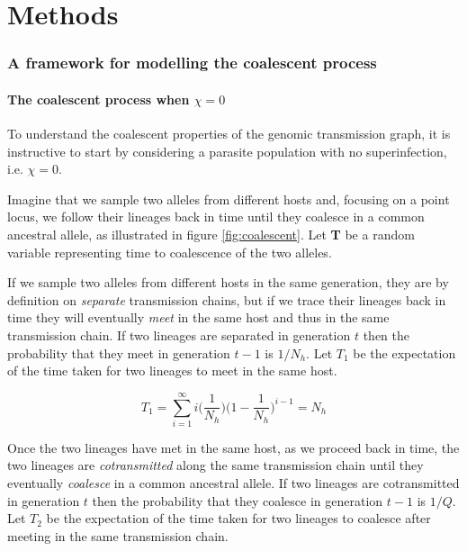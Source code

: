 \documentclass[_main.tex]{subfiles}
\begin{document}
\part*{Methods}
\label{supp_methods}

\section{A framework for modelling the coalescent process}

\subsection{The coalescent process when \texorpdfstring{$\chi = 0$}{chi is zero}}
\label{supp_coal_chi_zero}

To understand the coalescent properties of the genomic transmission graph, it is instructive to start by considering a parasite population with no superinfection, i.e. $\chi =0$.

Imagine that we sample two alleles from different hosts and, focusing on a point locus, we follow their lineages back in time until they coalesce in a common ancestral allele, as illustrated in figure \ref{fig:coalescent}.  Let \textbf{T} be a random variable representing time to coalescence of the two alleles.

If we sample two alleles from different hosts in the same generation, they are by definition on \textit{separate} transmission chains, but if we trace their lineages back in time they will eventually \textit{meet} in the same host and thus in the same transmission chain.  If two lineages are separated in generation $t$ then the probability that they meet in generation $t-1$ is $1/N_h$.   Let $T_1$ be the expectation of the time taken for two lineages to meet in the same host.

\begin{equation*}
T_1 = 
\sum_{i=1}^\infty
i \Big( \frac{1}{N_h} \Big)
\Big( 1 - \frac{1}{N_h} \Big)^{i-1}
 = N_h
\end{equation*}

Once the two lineages have met in the same host, as we proceed back in time, the two lineages are \textit{cotransmitted} along the same transmission chain until they eventually \textit{coalesce} in a common ancestral allele.  If two lineages are cotransmitted in generation $t$ then the probability that they coalesce in generation $t-1$ is $1/Q$.  Let $T_2$ be the expectation of the time taken for two lineages to coalesce after meeting in the same transmission chain.
\end{document}
